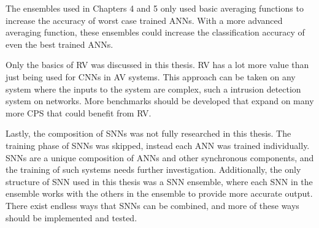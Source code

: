 The ensembles used in Chapters 4 and 5 only used basic averaging functions to increase the accuracy of worst case trained \acp{ANN}.
With a more advanced averaging function, these ensembles could increase the classification accuracy of even the best trained \acp{ANN}.

Only the basics of \ac{RV} was discussed in this thesis.
\ac{RV} has a lot more value than just being used for \acp{CNN} in \ac{AV} systems.
This approach can be taken on any system where the inputs to the system are complex, such a intrusion detection system on networks. 
More benchmarks should be developed that expand on many more \ac{CPS} that could benefit from \ac{RV}.

Lastly, the composition of \acp{SNN} was not fully researched in this thesis.
The training phase of \acp{SNN} was skipped, instead each \ac{ANN} was trained individually.
\acp{SNN} are a unique composition of \acp{ANN} and other synchronous components, and the training of such systems needs further investigation.
Additionally, the only structure of \ac{SNN} used in this thesis was a \ac{SNN} ensemble, where each \ac{SNN} in the ensemble works with the others in the ensemble to provide more accurate output.
There exist endless ways that \acp{SNN} can be combined, and more of these ways should be implemented and tested.










